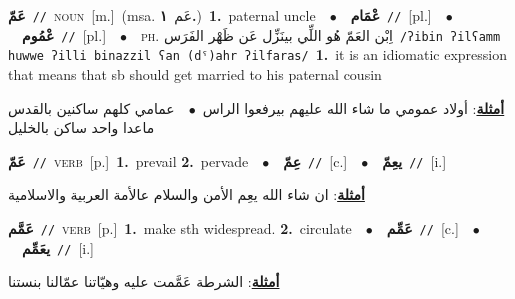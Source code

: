 \documentclass[10pt,a4paper,twoside]{article} %
\begin{document}
\begin{multicols}{2}
{\setlength\topsep{0pt}\textbf{\foreignlanguage{arabic}{عَمّ}}\ {\color{gray}\texttt{//}\color{black}}\ \textsc{noun}\ [m.]\ \color{gray}(msa. \foreignlanguage{arabic}{عَم}~\foreignlanguage{arabic}{\textbf{١.}})\color{black}\ \textbf{1.}~paternal uncle\ \ $\bullet$\ \ \setlength\topsep{0pt}\textbf{\foreignlanguage{arabic}{عْمَام}}\ {\color{gray}\texttt{//}\color{black}}\ [pl.]\ \ $\bullet$\ \ \setlength\topsep{0pt}\textbf{\foreignlanguage{arabic}{عْمُوم}}\ {\color{gray}\texttt{//}\color{black}}\ [pl.]\ \ $\bullet$\ \ \textsc{ph.} \color{gray} \foreignlanguage{arabic}{اِبْن العَمّ هُو اللِّي بينَزِّل عَن ظَهْر الفَرَس}\color{black}\ {\color{gray}\texttt{/{\sffamily ʔibin ʔilʕamm huwwe ʔilli binazzil ʕan (dˤ)ahr ʔilfaras}/}\color{black}}\ \textbf{1.}~it is an idiomatic expression that means that sb should get married to his paternal cousin\  \begin{flushright}\color{gray}\foreignlanguage{arabic}{\textbf{\underline{\foreignlanguage{arabic}{أمثلة}}}: أولاد عمومي ما شاء الله عليهم بيرفعوا الراس\ $\bullet$\ \  عمامي كلهم ساكنين بالقدس ماعدا واحد ساكن بالخليل}\end{flushright}\color{black}} \vspace{2mm}

{\setlength\topsep{0pt}\textbf{\foreignlanguage{arabic}{عَمّ}}\ {\color{gray}\texttt{//}\color{black}}\ \textsc{verb}\ [p.]\ \textbf{1.}~prevail  \textbf{2.}~pervade\ \ $\bullet$\ \ \setlength\topsep{0pt}\textbf{\foreignlanguage{arabic}{عِمّ}}\ {\color{gray}\texttt{//}\color{black}}\ [c.]\ \ $\bullet$\ \ \setlength\topsep{0pt}\textbf{\foreignlanguage{arabic}{يعِمّ}}\ {\color{gray}\texttt{//}\color{black}}\ [i.]\  \begin{flushright}\color{gray}\foreignlanguage{arabic}{\textbf{\underline{\foreignlanguage{arabic}{أمثلة}}}: ان شاء الله يعِم الأمن والسلام عالأمة العربية والاسلامية}\end{flushright}\color{black}} \vspace{2mm}

{\setlength\topsep{0pt}\textbf{\foreignlanguage{arabic}{عَمَّم}}\ {\color{gray}\texttt{//}\color{black}}\ \textsc{verb}\ [p.]\ \textbf{1.}~make sth widespread.  \textbf{2.}~circulate\ \ $\bullet$\ \ \setlength\topsep{0pt}\textbf{\foreignlanguage{arabic}{عَمِّم}}\ {\color{gray}\texttt{//}\color{black}}\ [c.]\ \ $\bullet$\ \ \setlength\topsep{0pt}\textbf{\foreignlanguage{arabic}{يعَمِّم}}\ {\color{gray}\texttt{//}\color{black}}\ [i.]\  \begin{flushright}\color{gray}\foreignlanguage{arabic}{\textbf{\underline{\foreignlanguage{arabic}{أمثلة}}}: الشرطة عَمَّمت عليه وهيّاتنا عمّالنا بنستنا}\end{flushright}\color{black}} \vspace{2mm}


\end{multicols}
\end{document}
